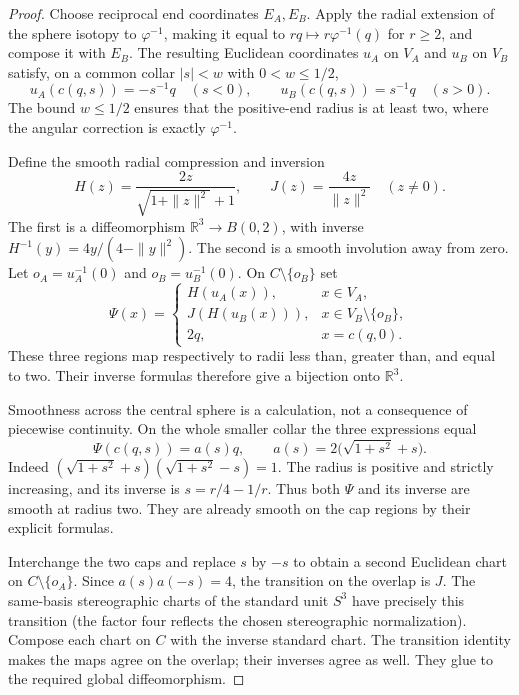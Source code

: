 \begin{proof}
Choose reciprocal end coordinates $E_A,E_B$.  Apply the radial extension
of the sphere isotopy to $\varphi^{-1}$, making it equal to
$rq\mapsto r\varphi^{-1}(q)$ for $r\ge2$, and compose it with $E_B$.
The resulting Euclidean coordinates $u_A$ on $V_A$ and $u_B$ on $V_B$
satisfy, on a common collar $|s|<w$ with $0<w\le1/2$,
\[
 u_A(c(q,s))=-s^{-1}q\quad(s<0),\qquad
 u_B(c(q,s))=s^{-1}q\quad(s>0).
\]
The bound $w\le1/2$ ensures that the positive-end radius is at least two,
where the angular correction is exactly $\varphi^{-1}$.

Define the smooth radial compression and inversion
\[
 H(z)=\frac{2z}{\sqrt{1+\|z\|^2}+1},\qquad
 J(z)=\frac{4z}{\|z\|^2}\quad(z\ne0).
\]
The first is a diffeomorphism $\mathbb R^3\to B(0,2)$,
with inverse $H^{-1}(y)=4y/(4-\|y\|^2)$.
The second is a smooth involution away from zero.  Let
$o_A=u_A^{-1}(0)$ and $o_B=u_B^{-1}(0)$.  On $C\setminus\{o_B\}$
set
\[
 \Psi(x)=
 \begin{cases}
 H(u_A(x)),&x\in V_A,\\
 J(H(u_B(x))),&x\in V_B\setminus\{o_B\},\\
 2q,&x=c(q,0).
 \end{cases}
\]
These three regions map respectively to radii less than, greater than,
and equal to two.  Their inverse formulas therefore give a bijection
onto $\mathbb R^3$.

Smoothness across the central sphere is a calculation, not a consequence
of piecewise continuity.  On the whole smaller collar the three
expressions equal
\[
       \Psi(c(q,s))=a(s)q,\qquad
       a(s)=2\bigl(\sqrt{1+s^2}+s\bigr).
\]
Indeed $(\sqrt{1+s^2}+s)(\sqrt{1+s^2}-s)=1$.
The radius is positive and strictly increasing, and its inverse is
$s=r/4-1/r$.  Thus both $\Psi$ and its inverse are smooth at radius two.
They are already smooth on the cap regions by their explicit formulas.

Interchange the two caps and replace $s$ by $-s$ to obtain a second
Euclidean chart on $C\setminus\{o_A\}$.  Since $a(s)a(-s)=4$,
the transition on the overlap is $J$.  The same-basis stereographic
charts of the standard unit $S^3$ have precisely this transition
(the factor four reflects the chosen stereographic normalization).
Compose each chart on $C$ with the inverse standard chart.  The
transition identity makes the maps agree on the overlap; their inverses
agree as well.  They glue to the required global diffeomorphism.
\end{proof}

